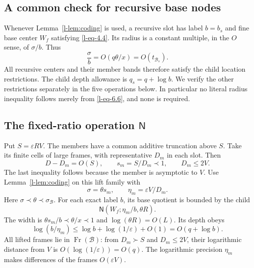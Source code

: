 \documentclass[11pt]{article}
\theoremstyle{definition}
\theoremstyle{remark}
\newcommand{\Fr}{\operatorname{Fr}}
\newcommand{\NN}{\mathsf N}
\newcommand{\calB}{\mathcal B}
\numberwithin{equation}{section}
\begin{document}
\subsection{A common check for recursive base nodes}

Whenever Lemma~\ref{l-lem:coding} is used, a recursive slot has
label $b=b_s$ and fine base center $W_f$ satisfying \eqref{l-eq-4.4}.
Its radius is a constant multiple, in the $O$ sense, of $\sigma/b$.
Thus
\begin{equation}
 \frac{\sigma}{b}=O(q\theta/x)=O(t_{\calB_s}).
 \label{l-eq-6.6}
\end{equation}
All recursive centers and their member bands therefore satisfy the
child location restrictions.  The child depth allowance is
$q_s=q+\log b$.
We verify the other restrictions separately in the five operations
below.  In particular no literal radius inequality follows merely
from \eqref{l-eq-6.6}, and none is required.

\subsection{The fixed-ratio operation \texorpdfstring{$\NN$}{N}}\label{l-sec:N}

Put $S=\varepsilon R V$.
The members have a common additive truncation above $S$.
Take its finite cells of large frames, with representative $D_m$
in each slot.  Then
\begin{equation}
 D-D_m=O(S),\qquad
 s_m=S/D_m\prec1,\qquad D_m\le2V.
 \label{l-eq-6.7}
\end{equation}
The last inequality follows because the member is asymptotic to $V$.
Use Lemma~\ref{l-lem:coding} on this lift family with
\begin{equation}
 \sigma=\theta s_m,\qquad \eta_m=\varepsilon V/D_m.
 \label{l-eq-6.8}
\end{equation}
Here $\sigma\prec\theta\prec\sigma_{\calB}$.
For each exact label $b$, its base quotient is bounded by the child
\begin{equation}
 \NN(W_f;\eta_m/b,\theta R).
 \label{l-eq-6.9}
\end{equation}
The width is $\theta s_m/b\prec\theta/x\prec1$ and
$\log(\theta R)=O(L)$.
Its depth obeys
\begin{equation}
 \log(b/\eta_m)
   \le \log b+\log(1/\varepsilon)+O(1)=O(q+\log b).
 \label{l-eq-6.10}
\end{equation}
All lifted frames lie in $\Fr(\calB)$: from $D_m\succ S$ and
$D_m\le2V$, their logarithmic distance from $V$ is
$O(\log(1/\varepsilon))=O(q)$.
The logarithmic precision $\eta_m$ makes differences of the frames
$O(\varepsilon V)$.
\end{document}
